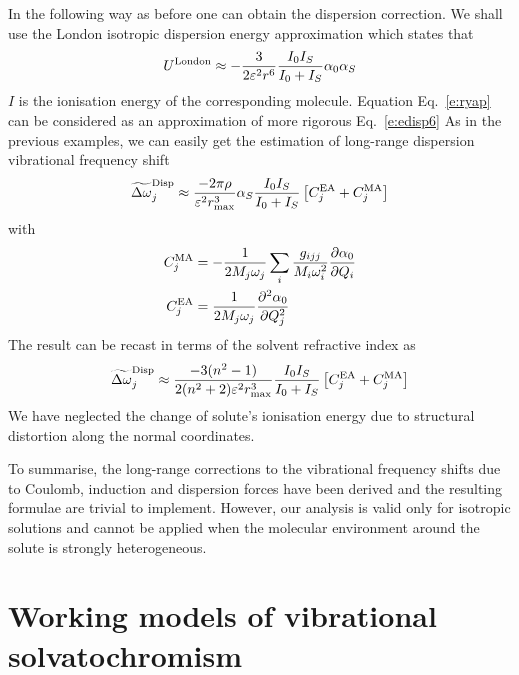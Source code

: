 \documentclass[a4paper,titlepage,twoside,fleqn,12pt]{book}
\newcommand{\fderiv}[2]{\ensuremath{
    \frac{\partial #1}{\partial #2}}}
\newcommand{\sderiv}[2]{\ensuremath{
    \frac{\partial^2 #1}{\partial #2^2}
    }}
\begin{document}
\begin{refsection}
In the following way as before one can obtain the
dispersion correction. We shall use the London isotropic
dispersion energy approximation which states that \citep{London.TransFaradSoc.1937}
%
\begin{equation} \label{e:ryap}
 U^{\rm London} \approx -\frac{3}{2\varepsilon^2 r^6} \frac{I_0I_S}{I_0+I_S} \alpha_0 \alpha_S
\end{equation}
%
$I$ is the ionisation energy of the corresponding
molecule. Equation Eq.~\eqref{e:ryap}
can be considered as an approximation of more rigorous Eq.~\eqref{e:edisp6}
As in the previous examples, we can easily get the estimation of
long\hyp{}range dispersion vibrational frequency shift
%
\begin{equation} \label{e:x123413}
 \widetilde{\Delta \omega}_j^{\rm Disp} \approx
\frac{-2\pi\rho}{\varepsilon^2 r_{\max}^3} \alpha_S \frac{I_0I_S}{I_0+I_S} \left[ C_j^{\rm EA} + C_j^{\rm MA} \right]
\end{equation}
%
with
%
\begin{subequations}
\begin{align}
  C_j^{\rm MA} &= -\frac{1}{2M_j\omega_j}\sum_i \frac{g_{ijj}}{M_i\omega_i^2} \fderiv{\alpha_0}{Q_i}\\
  C_j^{\rm EA} &= \frac{1}{2M_j\omega_j} \sderiv{\alpha_0}{Q_j}
\end{align}
\end{subequations}
%
The result
can be recast in terms of the solvent refractive index
as
%
\begin{equation} \label{e:x1234161}
 \widetilde{\Delta \omega}_j^{\rm Disp} \approx
\frac{-3(n^2-1)}{2(n^2+2)\varepsilon^2 r_{\max}^3} \frac{I_0I_S}{I_0+I_S} \left[ C_j^{\rm EA} + C_j^{\rm MA} \right]
\end{equation}
%
We have neglected the change of solute's ionisation energy due to structural
distortion along the normal coordinates. 

To summarise, the long\hyp{}range corrections to the vibrational
frequency shifts due to Coulomb, induction and dispersion forces
have been derived and the resulting formulae are trivial to implement.
However, our analysis is valid only for isotropic solutions and cannot be 
applied when the molecular environment around the solute is strongly heterogeneous.

\section{Working models of vibrational solvatochromism\label{s:solx-models-working}}


\end{refsection}
\end{document}
